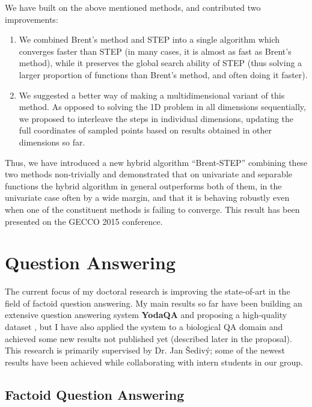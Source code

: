 We have built on the above mentioned methods, and contributed two improvements:

\begin{enumerate}
	\item We combined Brent's method and STEP into a single algorithm which converges faster than STEP (in many cases, it is almost as fast as Brent's method), while it preserves the global search ability of STEP (thus solving a larger proportion of functions than Brent's method, and often doing it faster).

	\item We suggested a better way of making a multidimensional variant of this method. As opposed to solving the 1D problem in all dimensions sequentially, we proposed to interleave the steps in individual dimensions, updating the full coordinates of sampled points based on results obtained in other dimensions so far.
\end{enumerate}

Thus, we have introduced a new hybrid algorithm ``Brent-STEP'' combining
these two methods non-trivially and demonstrated that
on univariate and separable functions the hybrid algorithm
in general outperforms both of them,
in the univariate case often by a wide margin,
and that it is behaving robustly even when one of the constituent methods
is failing to converge.
This result has been presented on the GECCO 2015 conference.
\cite{ndsqistep}

\section{Question Answering}

The current focus of my doctoral research
is improving the state-of-art in the field of factoid question answering.
My main results so far have been
building an extensive question answering system \textbf{YodaQA} \cite{YodaQAPoster2015}
and proposing a high-quality dataset \cite{YodaQACLEF2015},
but I have also applied the system to a biological QA domain \cite{YodaQABioASQ2015}
and achieved some new results not published yet (described later in the proposal).
This research is primarily supervised by Dr. Jan Šedivý;
some of the newest results have been achieved while collaborating
with intern students in our group.

\subsection{Factoid Question Answering}

